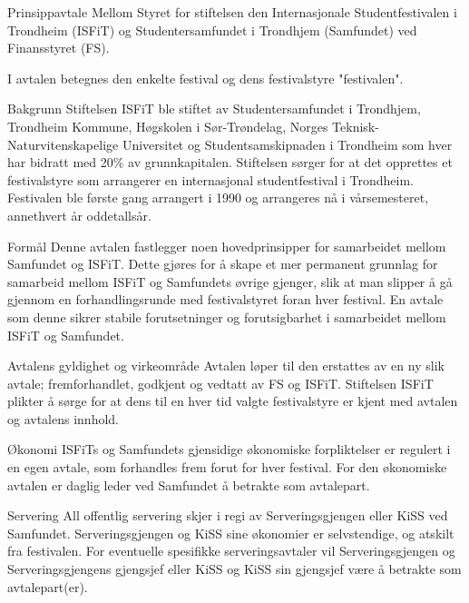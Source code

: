 
\begin{instruks}{Prinsippavtale Mellom Styret for stiftelsen den Internasjonale Studentfestivalen i
        Trondheim (ISFiT) og Studentersamfundet i Trondhjem (Samfundet) ved Finansstyret
        (FS).}{}{}

        I avtalen betegnes den enkelte festival og dens festivalstyre "festivalen".

    \begin{instruksledd}{Bakgrunn}
        Stiftelsen ISFiT ble stiftet av Studentersamfundet i Trondhjem, Trondheim Kommune, Høgskolen
        i Sør-Trøndelag, Norges Teknisk-Naturvitenskapelige Universitet og Studentsamskipnaden i Trondheim
        som hver har bidratt med 20\% av grunnkapitalen. Stiftelsen sørger for at det opprettes et
        festivalstyre som arrangerer en internasjonal studentfestival i Trondheim. Festivalen ble første
        gang arrangert i 1990 og arrangeres nå i vårsemesteret, annethvert år oddetallsår.
    \end{instruksledd}

    \begin{instruksledd}{Formål}
        Denne avtalen fastlegger noen hovedprinsipper for samarbeidet mellom Samfundet og ISFiT.
        Dette gjøres for å skape et mer permanent grunnlag for samarbeid mellom ISFiT og Samfundets øvrige
        gjenger, slik at man slipper å gå gjennom en forhandlingsrunde med festivalstyret foran hver
        festival. En avtale som denne sikrer stabile forutsetninger og forutsigbarhet i samarbeidet mellom
        ISFiT og Samfundet.
    \end{instruksledd}        

    \begin{instruksledd}{Avtalens gyldighet og virkeområde}
        Avtalen løper til den erstattes av en ny slik avtale; fremforhandlet, godkjent og
        vedtatt av FS og ISFiT. Stiftelsen ISFiT plikter å sørge for at dens til en hver tid valgte
        festivalstyre er kjent med avtalen og avtalens innhold.
    \end{instruksledd}

    \begin{instruksledd}{Økonomi}
        ISFiTs og Samfundets gjensidige økonomiske forpliktelser er regulert i en egen avtale, som
        forhandles frem forut for hver festival. For den økonomiske avtalen er daglig leder ved Samfundet å
        betrakte som avtalepart.
    \end{instruksledd}

    \begin{instruksledd}{Servering}
        All offentlig servering skjer i regi av Serveringsgjengen eller KiSS ved Samfundet.
        Serveringsgjengen og KiSS sine økonomier er selvstendige, og atskilt fra festivalen. For eventuelle
        spesifikke serveringsavtaler vil Serveringsgjengen og Serveringsgjengens gjengsjef eller KiSS og
        KiSS sin gjengsjef være å betrakte som avtalepart(er).
    \end{instruksledd}


\end{instruks}
